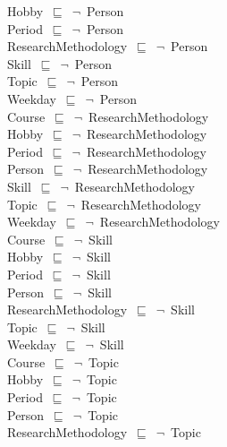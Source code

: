 \documentclass{article}
\begin{document}
Hobby~\ensuremath{\sqsubseteq}~\ensuremath{\lnot}~Person\\
Period~\ensuremath{\sqsubseteq}~\ensuremath{\lnot}~Person\\
ResearchMethodology~\ensuremath{\sqsubseteq}~\ensuremath{\lnot}~Person\\
Skill~\ensuremath{\sqsubseteq}~\ensuremath{\lnot}~Person\\
Topic~\ensuremath{\sqsubseteq}~\ensuremath{\lnot}~Person\\
Weekday~\ensuremath{\sqsubseteq}~\ensuremath{\lnot}~Person\\
Course~\ensuremath{\sqsubseteq}~\ensuremath{\lnot}~ResearchMethodology\\
Hobby~\ensuremath{\sqsubseteq}~\ensuremath{\lnot}~ResearchMethodology\\
Period~\ensuremath{\sqsubseteq}~\ensuremath{\lnot}~ResearchMethodology\\
Person~\ensuremath{\sqsubseteq}~\ensuremath{\lnot}~ResearchMethodology\\
Skill~\ensuremath{\sqsubseteq}~\ensuremath{\lnot}~ResearchMethodology\\
Topic~\ensuremath{\sqsubseteq}~\ensuremath{\lnot}~ResearchMethodology\\
Weekday~\ensuremath{\sqsubseteq}~\ensuremath{\lnot}~ResearchMethodology\\
Course~\ensuremath{\sqsubseteq}~\ensuremath{\lnot}~Skill\\
Hobby~\ensuremath{\sqsubseteq}~\ensuremath{\lnot}~Skill\\
Period~\ensuremath{\sqsubseteq}~\ensuremath{\lnot}~Skill\\
Person~\ensuremath{\sqsubseteq}~\ensuremath{\lnot}~Skill\\
ResearchMethodology~\ensuremath{\sqsubseteq}~\ensuremath{\lnot}~Skill\\
Topic~\ensuremath{\sqsubseteq}~\ensuremath{\lnot}~Skill\\
Weekday~\ensuremath{\sqsubseteq}~\ensuremath{\lnot}~Skill\\
Course~\ensuremath{\sqsubseteq}~\ensuremath{\lnot}~Topic\\
Hobby~\ensuremath{\sqsubseteq}~\ensuremath{\lnot}~Topic\\
Period~\ensuremath{\sqsubseteq}~\ensuremath{\lnot}~Topic\\
Person~\ensuremath{\sqsubseteq}~\ensuremath{\lnot}~Topic\\
ResearchMethodology~\ensuremath{\sqsubseteq}~\ensuremath{\lnot}~Topic\\
\end{document}
